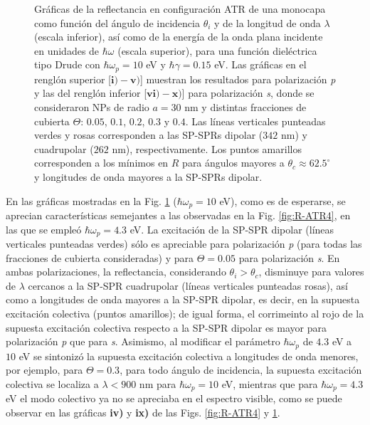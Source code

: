 \begin{figure}[b!]
\vspace*{-.5em}
	\caption{Gráficas de la reflectancia en configuración ATR de una monocapa como función del ángulo de incidencia $\theta_i$ y de la longitud de onda $\lambda$ (escala inferior), así como de la energía de la onda plana incidente en unidades de $\hbar\omega$ (escala superior), para una función dieléctrica tipo Drude con $\hbar\omega_p=10$ eV  y  $\hbar\gamma=0. 15$ eV.  Las gráficas   en el renglón superior [$\mathbf{i)-v)}$] muestran los resultados  para  polarización \emph{p} y las del renglón inferior  [$\mathbf{vi)-x)}$] para polarización  \emph{s}, donde se consideraron NPs de radio $a=30$ nm y distintas fracciones de cubierta $\Theta$: $0. 05$, $0. 1$, $0. 2$, $0. 3$ y $0. 4$. Las líneas verticales punteadas verdes y rosas corresponden a las SP-SPRs dipolar ($342$ nm) y cuadrupolar ($262$ nm), respectivamente.  Los puntos amarillos corresponden a los mínimos en $R$ para ángulos mayores a $\theta_c\approx 62.5^\circ$ y longitudes de onda mayores a la SP-SPRs dipolar. }	\label{fig:R-ATR10}	
	\end{figure}		
	
En las gráficas mostradas en la Fig. \ref{fig:R-ATR10} ($\hbar\omega_p = 10$ eV), como es de esperarse, se aprecian características semejantes a las observadas en la Fig. \ref{fig:R-ATR4}, en las que se empleó $\hbar\omega_p = 4.3$ eV. La excitación de la SP-SPR dipolar (líneas verticales punteadas verdes) sólo es apreciable para polarización \emph{p} (para todas las fracciones de cubierta consideradas) y para $\Theta = 0.05$ para polarización  \emph{s}. En ambas polarizaciones, la reflectancia, considerando $\theta_i>\theta_c$, disminuye para valores de $\lambda$ cercanos a la SP-SPR cuadrupolar (líneas verticales punteadas rosas), así como a longitudes de onda mayores a la SP-SPR dipolar, es decir, en la supuesta excitación colectiva  (puntos amarillos); de igual forma, el corrimeinto al rojo de la supuesta excitación colectiva respecto a la SP-SPR dipolar es mayor para polarización \emph{p} que para \emph{s}.  Asimismo, al modificar el parámetro $\hbar\omega_p$ de $4.3$ eV a $10$ eV se sintonizó la supuesta excitación colectiva a longitudes de onda menores, por ejemplo, para $\Theta = 0.3$, para todo ángulo de incidencia, la supuesta excitación colectiva se localiza a $\lambda<900$ nm para $\hbar\omega_p=10$ eV, mientras que para $\hbar\omega_p=4.3$ eV el modo colectivo ya no se apreciaba en el espectro visible, como se puede observar en las gráficas \textbf{iv)} y \textbf{ix)} de las Figs. \ref{fig:R-ATR4} y \ref{fig:R-ATR10}.

